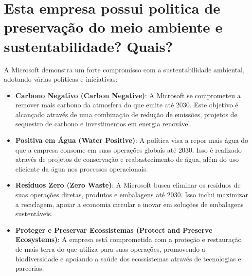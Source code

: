\section{Esta empresa possui politica de preservação do meio ambiente e sustentabilidade? Quais?}

A Microsoft demonstra um forte compromisso com a sustentabilidade ambiental, adotando várias políticas e iniciativas:

\begin{itemize}
    \item \textbf{Carbono Negativo (Carbon Negative)}: A Microsoft se comprometeu a remover mais carbono da atmosfera do que emite até 2030. Este objetivo é alcançado através de uma combinação de redução de emissões, projetos de sequestro de carbono e investimentos em energia renovável.
    \item \textbf{Positiva em Água (Water Positive)}: A política visa a repor mais água do que a empresa consome em suas operações globais até 2030. Isso é realizado através de projetos de conservação e reabastecimento de água, além do uso eficiente da água nos processos operacionais.
    \item \textbf{Resíduos Zero (Zero Waste)}: A Microsoft busca eliminar os resíduos de suas operações diretas, produtos e embalagens até 2030. Isso inclui maximizar a reciclagem, apoiar a economia circular e inovar em soluções de embalagens sustentáveis.
    \item \textbf{Proteger e Preservar Ecossistemas (Protect and Preserve Ecosystems)}: A empresa está comprometida com a proteção e restauração de mais terra do que utiliza para suas operações, promovendo a biodiversidade e apoiando a saúde dos ecossistemas através de tecnologias e parcerias.
\end{itemize}